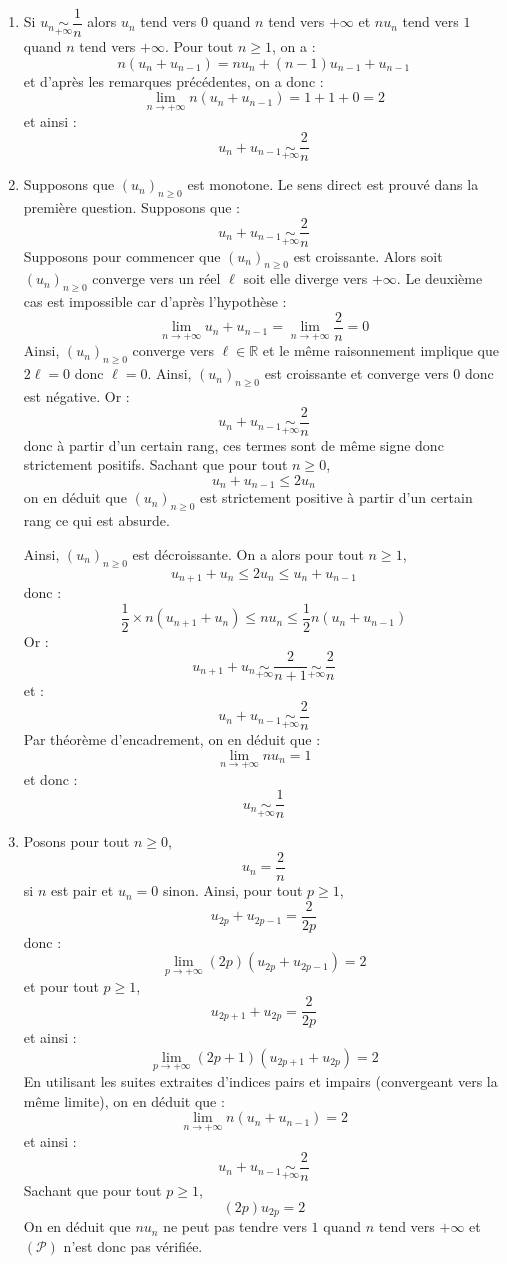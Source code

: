 \documentclass[a4paper,10pt]{report}
\begin{document}
\corr \begin{enumerate}
\item Si $u_n \underset{+ \infty}{\sim} \dfrac{1}{n}$ alors $u_n$ tend vers $0$ quand $n$ tend vers $+ \infty$ et $n u_n $ tend vers $1$ quand $n$ tend vers $+ \infty$. Pour tout $n \geq 1$, on a :
$$n(u_n + u_{n-1}) = n u_n + (n-1)u_{n-1}  + u_{n-1}$$
et d'après les remarques précédentes, on a donc :
$$ \lim_{n \rightarrow + \infty} n(u_n + u_{n-1})  = 1+1+0 = 2$$
et ainsi :
$$ u_n + u_{n-1} \underset{+ \infty}{\sim} \dfrac{2}{n}$$

\item Supposons que $(u_n)_{n \geq 0}$ est monotone. Le sens direct est prouvé dans la première question. Supposons que :
$$ u_n + u_{n-1} \underset{+ \infty}{\sim} \dfrac{2}{n}$$
Supposons pour commencer que $(u_n)_{n \geq 0}$ est croissante. Alors soit $(u_n)_{n \geq 0}$ converge vers un réel $\ell$ soit elle diverge vers $+ \infty$. Le deuxième cas est impossible car d'après l'hypothèse :
$$ \lim_{n \rightarrow + \infty} u_n + u_{n-1} = \lim_{n \rightarrow + \infty} \dfrac{2}{n} = 0$$
Ainsi, $(u_n)_{n \geq 0}$ converge vers $\ell \in \mathbb{R}$ et le même raisonnement implique que $2 \ell =0$ donc $\ell =0$. Ainsi, $(u_n)_{n \geq 0}$ est croissante et converge vers $0$ donc est négative. Or :
$$ u_n + u_{n-1} \underset{+ \infty}{\sim} \dfrac{2}{n}$$
donc à partir d'un certain rang, ces termes sont de même signe donc strictement positifs. Sachant que pour tout $n \geq 0$,
$$ u_n + u_{n-1} \leq 2u_n$$
on en déduit que $(u_n)_{n \geq 0}$ est strictement positive à partir d'un certain rang ce qui est absurde.

\medskip

\noindent Ainsi, $(u_n)_{n \geq 0}$ est décroissante. On a alors pour tout $n \geq 1$,
$$ u_{n+1}+u_n \leq    2u_n \leq u_n + u_{n-1}$$
donc :
$$ \dfrac{1}{2} \times n(u_{n+1}+u_n) \leq   nu_n \leq \dfrac{1}{2} n(u_n + u_{n-1})$$
Or :
$$  u_{n+1}+u_n \underset{+ \infty}{\sim} \dfrac{2}{n+1} \underset{+ \infty}{\sim} \dfrac{2}{n}$$
et :
$$  u_n + u_{n-1} \underset{+ \infty}{\sim} \dfrac{2}{n} $$
Par théorème d'encadrement, on en déduit que :
$$ \lim_{n \rightarrow + \infty} n u_n  = 1$$
et donc :
$$u_n \underset{+ \infty}{\sim} \dfrac{1}{n}$$
\item Posons pour tout $n \geq 0$,
$$ u_n = \dfrac{2}{n}$$
si $n$ est pair et $u_n=0$ sinon. Ainsi, pour tout $p \geq 1$,
$$ u_{2p} + u_{2p-1} =  \dfrac{2}{2p}$$
donc :
$$ \lim_{p \rightarrow + \infty} (2p) (u_{2p} + u_{2p-1}) = 2$$
et pour tout $p \geq 1$,
$$ u_{2p+1} + u_{2p} = \dfrac{2}{2p}$$
et ainsi :
$$ \lim_{p \rightarrow + \infty} (2p+1)(u_{2p+1} + u_{2p}) = 2$$
En utilisant les suites extraites d'indices pairs et impairs (convergeant vers la même limite), on en déduit que :
$$ \lim_{n \rightarrow + \infty} n (u_n + u_{n-1}) = 2$$
et ainsi :
$$ u_n + u_{n-1} \underset{+ \infty}{\sim} \dfrac{2}{n} $$
Sachant que pour tout $p \geq 1$,
$$ (2p) u_{2p} = 2 $$
On en déduit que $nu_n$ ne peut pas tendre vers $1$ quand $n$ tend vers $+ \infty$ et $(\mathcal{P})$ n'est donc pas vérifiée.
\end{enumerate}
\end{document}
